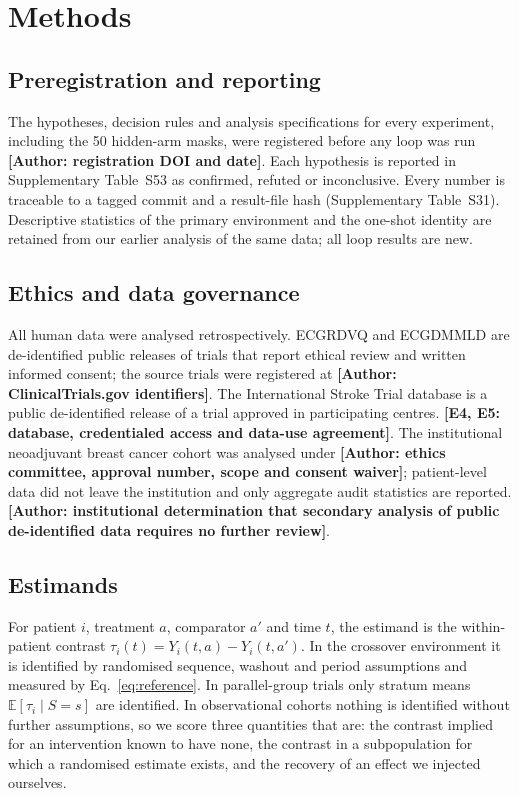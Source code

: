 \documentclass[11pt,a4paper]{article}
\newcommand{\Ex}{\mathbb E}
\newcommand{\tbd}[1]{{\color{red}\textbf{[#1]}}}
\newcommand{\authorpending}[1]{{\color{red}\textbf{[Author: #1]}}}
\begin{document}
\section{Methods}
\subsection{Preregistration and reporting}
The hypotheses, decision rules and analysis specifications for every experiment, including the 50 hidden-arm masks, were registered before any loop was run \authorpending{registration DOI and date}. Each hypothesis is reported in Supplementary Table~S53 as confirmed, refuted or inconclusive. Every number is traceable to a tagged commit and a result-file hash (Supplementary Table~S31). Descriptive statistics of the primary environment and the one-shot identity are retained from our earlier analysis of the same data; all loop results are new.

\subsection{Ethics and data governance}
All human data were analysed retrospectively. ECGRDVQ and ECGDMMLD are de-identified public releases of trials that report ethical review and written informed consent\cite{johannesen2014multichannel,johannesen2016latena}; the source trials were registered at \authorpending{ClinicalTrials.gov identifiers}. The International Stroke Trial database is a public de-identified release of a trial approved in participating centres\cite{ist2011}. \tbd{E4, E5: database, credentialed access and data-use agreement}. The institutional neoadjuvant breast cancer cohort was analysed under \authorpending{ethics committee, approval number, scope and consent waiver}; patient-level data did not leave the institution and only aggregate audit statistics are reported. \authorpending{institutional determination that secondary analysis of public de-identified data requires no further review}.

\subsection{Estimands}
For patient $i$, treatment $a$, comparator $a'$ and time $t$, the estimand is the within-patient contrast $\tau_i(t)=Y_i(t,a)-Y_i(t,a')$. In the crossover environment it is identified by randomised sequence, washout and period assumptions\cite{senn2002crossover} and measured by Eq.~\ref{eq:reference}. In parallel-group trials only stratum means $\Ex[\tau_i\mid S=s]$ are identified. In observational cohorts nothing is identified without further assumptions, so we score three quantities that are: the contrast implied for an intervention known to have none, the contrast in a subpopulation for which a randomised estimate exists, and the recovery of an effect we injected ourselves.
\end{document}
